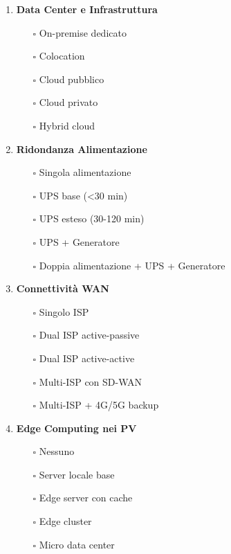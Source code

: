 \begin{enumerate}
\item \textbf{Data Center e Infrastruttura}
   \begin{itemize}
   \item[$\square$] On-premise dedicato
   \item[$\square$] Colocation
   \item[$\square$] Cloud pubblico
   \item[$\square$] Cloud privato
   \item[$\square$] Hybrid cloud
   \end{itemize}

\item \textbf{Ridondanza Alimentazione}
   \begin{itemize}
   \item[$\square$] Singola alimentazione
   \item[$\square$] UPS base (<30 min)
   \item[$\square$] UPS esteso (30-120 min)
   \item[$\square$] UPS + Generatore
   \item[$\square$] Doppia alimentazione + UPS + Generatore
   \end{itemize}

\item \textbf{Connettività WAN}
   \begin{itemize}
   \item[$\square$] Singolo ISP
   \item[$\square$] Dual ISP active-passive
   \item[$\square$] Dual ISP active-active
   \item[$\square$] Multi-ISP con SD-WAN
   \item[$\square$] Multi-ISP + 4G/5G backup
   \end{itemize}

\item \textbf{Edge Computing nei PV}
   \begin{itemize}
   \item[$\square$] Nessuno
   \item[$\square$] Server locale base
   \item[$\square$] Edge server con cache
   \item[$\square$] Edge cluster
   \item[$\square$] Micro data center
   \end{itemize}
\end{enumerate}

